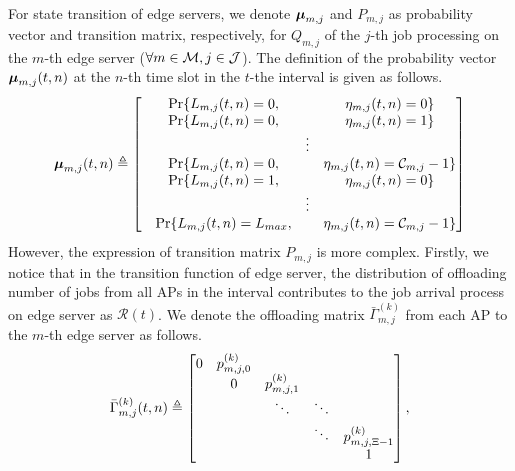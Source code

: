 For state transition of edge servers, we denote $\boldsymbol{\mu}_{m,j}$ and $P_{m,j}$ as probability vector and transition matrix, respectively, for $Q_{m,j}$ of the $j$-th job processing on the $m$-th edge server ($\forall m\in\mathcal{M}, j\in\mathcal{J}$). The definition of the probability vector $\boldsymbol{\mu}_{m,j}(t,n)$ at the $n$-th time slot in the $t$-the interval is given as follows.
\begin{align}
    \boldsymbol{\mu}_{m,j}(t,n) \triangleq 
    \begin{bmatrix}
        &\Pr\{L_{m,j}(t,n)=0,   &        & \eta_{m,j}(t,n)=0\} \\
        &\Pr\{L_{m,j}(t,n)=0,   &        & \eta_{m,j}(t,n)=1\} \\
        &                       & \vdots & \\
        &\Pr\{L_{m,j}(t,n)=0,   &        & \eta_{m,j}(t,n)=\mathcal{C}_{m,j}-1\} \\
        &\Pr\{L_{m,j}(t,n)=1,   &        & \eta_{m,j}(t,n)=0\} \\
        &                       & \vdots & \\
        &\Pr\{L_{m,j}(t,n)=L_{max}, &        & \eta_{m,j}(t,n)=\mathcal{C}_{m,j}-1\}
    \end{bmatrix}
\end{align}
However, the expression of transition matrix $P_{m,j}$ is more complex. Firstly, we notice that in the transition function of edge server, the distribution of offloading number of jobs from all APs in the interval contributes to the job arrival process on edge server as $\mathcal{R}(t)$. We denote the offloading matrix $\bar{\Gamma}^{(k)}_{m,j}$ from each AP to the $m$-th edge server as follows.
\begin{align}
    \bar{\Gamma}^{(k)}_{m,j}(t,n) \triangleq
    \begin{bmatrix}
        0 & p^{(k)}_{m,j,0} &                 &        &                     \\
          & 0               & p^{(k)}_{m,j,1} &        &                     \\
          &                 & \ddots          & \ddots &                     \\
          &                 &                 & \ddots & p^{(k)}_{m,j,\Xi-1} \\
          &                 &                 &        & 1                   \\
    \end{bmatrix},
\end{align}
